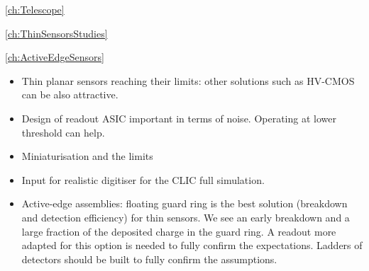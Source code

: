 \cref{ch:Telescope}

\cref{ch:ThinSensorsStudies}

\cref{ch:ActiveEdgeSensors}

\begin{itemize}
\item Thin planar sensors reaching their limits: other solutions such
  as HV-CMOS can be also attractive.
\item Design of readout ASIC important in terms of noise. Operating at
  lower threshold can help.
\item Miniaturisation and the limits
\item Input for realistic digitiser for the CLIC full simulation. 
\item Active-edge assemblies: floating guard ring is the best solution
  (breakdown and detection efficiency) for thin sensors. We see an
  early breakdown and a large fraction of the deposited charge in the
  guard ring. A readout more adapted for this option is needed to
  fully confirm the expectations. Ladders of detectors should be built
  to fully confirm the assumptions.
\end{itemize}
